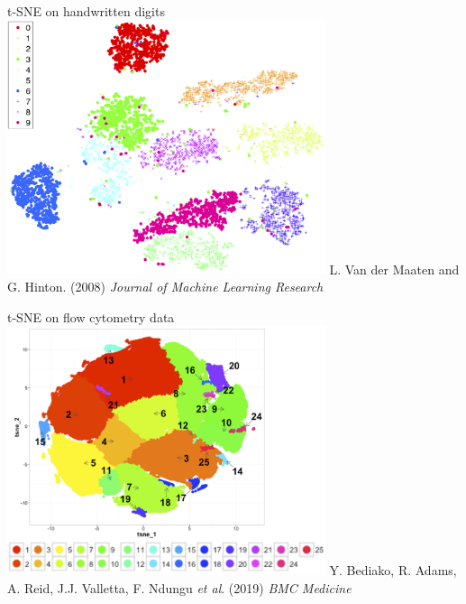 \documentclass[pdf]{beamer}
\begin{document}
\begin{frame}{t-SNE on handwritten digits}
\centering
\includegraphics[width=0.7\textwidth]{03-mnist.png}
\vfill
{\tiny L. Van der Maaten and G. Hinton. (2008) \textit{Journal of Machine Learning Research}}
\end{frame}

\begin{frame}{t-SNE on flow cytometry data}
\centering
\includegraphics[width=0.7\textwidth]{03-flow.png}
\vfill
{\tiny Y. Bediako, R. Adams, A. Reid, J.J. Valletta, F. Ndungu \textit{et al}. (2019) \textit{BMC Medicine}}
\end{frame}
\end{document}
